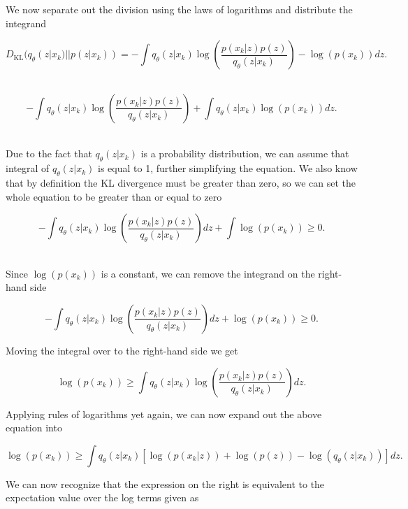We now separate out the division using the laws of logarithms and 
distribute the integrand

\begin{equation}
    D_{\textrm{KL}}(q_{\theta}(z|x_k) || p(z|x_k)) = -\int q_{\theta}(z|x_k) 
    \log(\frac{p(x_k|z) p(z)}{q_{\theta}(z|x_k)}) - \log(p(x_k)) dz. 
\end{equation}\

\begin{equation}
    -\int q_{\theta}(z|x_k) 
    \log(\frac{p(x_k|z) p(z)}{q_{\theta}(z|x_k)}) +
    \int q_{\theta}(z|x_k) \log(p(x_k)) dz. 
\end{equation}\

Due to the fact that $q_{\theta}(z|x_k)$ is a probability distribution, 
we can assume that integral of $q_{\theta}(z|x_k)$ is equal to 1, 
further simplifying the equation. We also know that by definition the KL 
divergence must be greater than zero, so we can set the whole 
equation to be greater than or equal to zero

\begin{equation}
    -\int q_{\theta}(z|x_k)
    \log(\frac{p(x_k|z) p(z)}{q_{\theta}(z|x_k)})dz +
    \int \log(p(x_k)) \geq 0. 
\end{equation}\

Since $\log(p(x_k))$ is a constant, we can remove the integrand 
on the right-hand side

\begin{equation}
    -\int q_{\theta}(z|x_k)
    \log(\frac{p(x_k|z) p(z)}{q_{\theta}(z|x_k)})dz +
    \log(p(x_k)) \geq 0.
\end{equation}

Moving the integral over to the right-hand side we get 

\begin{equation}
    \log(p(x_k)) \geq \int q_{\theta}(z|x_k)
    \log(\frac{p(x_k|z) p(z)}{q_{\theta}(z|x_k)})dz.\label{eq:lookbackKL}
\end{equation}

Applying rules of logarithms yet again, we can now expand 
out the above equation into 

\begin{equation}
    \log(p(x_k)) \geq \int q_{\theta}(z|x_k)
    [\log(p(x_k|z)) + \log(p(z)) - \log(q_{\theta}(z|x_k))] dz.
\end{equation}

We can now recognize that the expression on the right 
is equivalent to the expectation value over the log 
terms given as 


